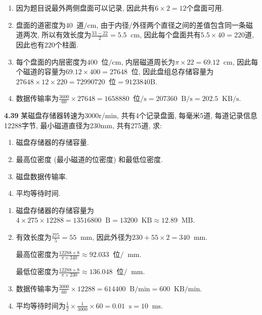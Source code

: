 \documentclass[UTF8]{report}
\newcommand{\mrm}[1]{\mathrm{#1}}
\newcommand*{\unit}[1]{\mathop{}\!\mathrm{#1}}
\newcommand{\problem}[1]{{\setlength{\parskip}{10pt}\noindent \bf{#1}}}
\newenvironment{solution}{{\noindent\hskip 2em \bf 解 \quad}}{}
\begin{document}
\begin{solution}
    \begin{enumerate}[label=(\arabic*)]
        \item 因为题目说最外两侧盘面可以记录, 因此共有$6 \times 2 = 12$个盘面可用.
        \item 盘面的道密度为$40\unit{\text{道}/cm}$, 由于内径/外径两个直径之间的差值包含同一条磁道两次, 所以有效长度为$\frac{33-22}{2} = 5.5\unit{cm}$, 因此每个盘面共有$5.5 \times 40 = 220$道, 因此也有$220$个柱面.
        \item 每个盘面的内层密度为$400\unit{\text{位}/cm}$, 内层磁道周长为$\pi \times 22 = 69.12 \unit{cm}$, 因此每个磁道的容量为$69.12 \times 400 = 27648\unit{位}$, 因此盘组总存储容量为$27648 \times 12 \times 220 = 72990720 \unit{位} = 9123840\mrm{B}$.
        \item 数据传输率为$\frac{3600}{60} \times 27648 = 1658880 \unit{\text{位}/s} = 207360 \unit{B/s} = 202.5 \unit{KB/s}$.
    \end{enumerate}
\end{solution}


\problem{4.39} 某磁盘存储器转速为3000r/min, 共有4个记录盘面, 每毫米5道, 每道记录信息12288字节, 最小磁道直径为230mm, 共有275道, 求:
\begin{enumerate}[label=(\arabic*)]
    \item 磁盘存储器的存储容量.
    \item 最高位密度 (最小磁道的位密度) 和最低位密度.
    \item 磁盘数据传输率.
    \item 平均等待时间.
\end{enumerate}

\begin{solution}
    \begin{enumerate}[label=(\arabic*)]
        \item 磁盘存储器的存储容量为$4 \times 275 \times 12288 = 13516800 \unit{B} = 13200 \unit{KB} \approx 12.89 \unit{MB}$.
        \item 有效长度为$\frac{275}{5} = 55 \unit{mm}$, 因此外径为$230 + 55 \times 2 = 340 \unit{mm}$.
        
        最高位密度为$\frac{12288 \times 8}{\pi \times 340} \approx 92.033 \unit{位}/\unit{mm}$.
        
        最低位密度为$\frac{12288 \times 8}{\pi \times 230} \approx 136.048 \unit{位}/\unit{mm}$.
        \item 数据传输率为$\frac{3000}{60}  \times 12288 = 614400 \unit{B/\text{min}} = 600 \unit{KB/\text{min}}$.
        \item 平均等待时间为$\frac{1}{2} \times \frac{1}{3000} \times 60 = 0.01 \unit{s} = 10 \unit{ms}$.
    \end{enumerate}
\end{solution}
\end{document}
